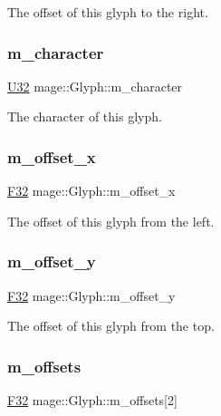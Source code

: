 The offset of this glyph to the right. \hypertarget{structmage_1_1_glyph_a1fc60ac3f30e27e5c7ccffa3b3bdd590}{}\label{structmage_1_1_glyph_a1fc60ac3f30e27e5c7ccffa3b3bdd590} 
\subsubsection{\texorpdfstring{m\+\_\+character}{m\_character}}
{\footnotesize\ttfamily \hyperlink{namespacemage_a41c104c036fba3756a74e19f793eeaa1}{U32} mage\+::\+Glyph\+::m\+\_\+character}

The character of this glyph. \hypertarget{structmage_1_1_glyph_ac2972ac6759f912820f099fde31fe06c}{}\label{structmage_1_1_glyph_ac2972ac6759f912820f099fde31fe06c} 
\subsubsection{\texorpdfstring{m\+\_\+offset\+\_\+x}{m\_offset\_x}}
{\footnotesize\ttfamily \hyperlink{namespacemage_aa97e833b45f06d60a0a9c4fc22ae02c0}{F32} mage\+::\+Glyph\+::m\+\_\+offset\+\_\+x}

The offset of this glyph from the left. \hypertarget{structmage_1_1_glyph_a45db4d78aeafa1278c2e9a17683a4cba}{}\label{structmage_1_1_glyph_a45db4d78aeafa1278c2e9a17683a4cba} 
\subsubsection{\texorpdfstring{m\+\_\+offset\+\_\+y}{m\_offset\_y}}
{\footnotesize\ttfamily \hyperlink{namespacemage_aa97e833b45f06d60a0a9c4fc22ae02c0}{F32} mage\+::\+Glyph\+::m\+\_\+offset\+\_\+y}

The offset of this glyph from the top. \hypertarget{structmage_1_1_glyph_a7608c64db7a5f951a51d7e66e105638b}{}\label{structmage_1_1_glyph_a7608c64db7a5f951a51d7e66e105638b} 
\subsubsection{\texorpdfstring{m\+\_\+offsets}{m\_offsets}}
{\footnotesize\ttfamily \hyperlink{namespacemage_aa97e833b45f06d60a0a9c4fc22ae02c0}{F32} mage\+::\+Glyph\+::m\+\_\+offsets\mbox{[}2\mbox{]}}

